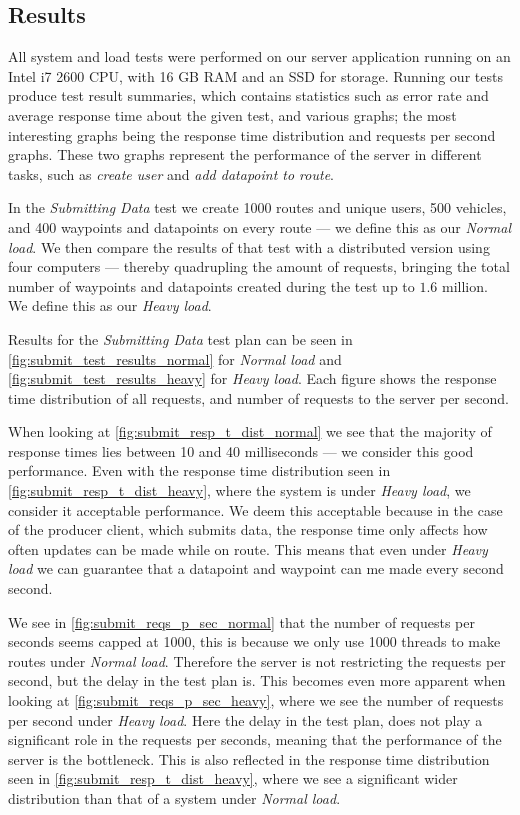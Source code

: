 \subsection{Results}
All system and load tests were performed on our server application running on an Intel i7 2600 CPU, with 16 GB RAM and an SSD for storage.
Running our tests produce test result summaries, which contains statistics such as error rate and average response time about the given test, and various graphs;
the most interesting graphs being the response time distribution and requests per second graphs.
These two graphs represent the performance of the server in different tasks, such as \textit{create user} and \textit{add datapoint to route}.

In the \textit{Submitting Data} test we create 1000 routes and unique users, 500 vehicles, and 400 waypoints and datapoints on every route --- we define this as our \textit{Normal load}.
We then compare the results of that test with a distributed version using four computers --- thereby quadrupling the amount of requests, bringing the total number of waypoints and datapoints created during the test up to $1.6$ million.
We define this as our \textit{Heavy load}.

\bigskip
Results for the \textit{Submitting Data} test plan can be seen in \cref{fig:submit_test_results_normal} for \textit{Normal load} and \cref{fig:submit_test_results_heavy} for \textit{Heavy load}.
Each figure shows the response time distribution of all requests, and number of requests to the server per second.

When looking at \cref{fig:submit_resp_t_dist_normal} we see that the majority of response times lies between 10 and 40 milliseconds --- we consider this good performance.
Even with the response time distribution seen in \cref{fig:submit_resp_t_dist_heavy}, where the system is under \textit{Heavy load}, we consider it acceptable performance.
We deem this acceptable because in the case of the producer client, which submits data, the response time only affects how often updates can be made while on route.
This means that even under \textit{Heavy load} we can guarantee that a datapoint and waypoint can me made every second second.

We see in \cref{fig:submit_reqs_p_sec_normal} that the number of requests per seconds seems capped at 1000, this is because we only use 1000 threads to make routes under \textit{Normal load}.
Therefore the server is not restricting the requests per second, but the delay in the test plan is.
This becomes even more apparent when looking at \cref{fig:submit_reqs_p_sec_heavy}, where we see the number of requests per second under \textit{Heavy load}.
Here the delay in the test plan, does not play a significant role in the requests per seconds, meaning that the performance of the server is the bottleneck.
This is also reflected in the response time distribution seen in \cref{fig:submit_resp_t_dist_heavy}, where we see a significant wider distribution than that of a system under \textit{Normal load}.

